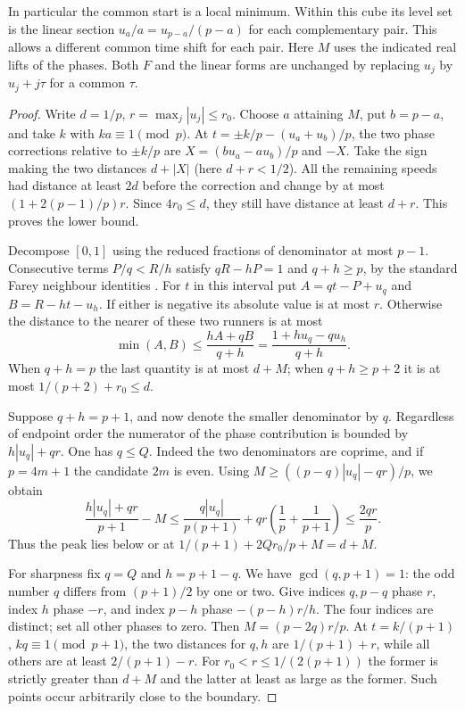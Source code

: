 \documentclass[11pt]{article}
\begin{document}
In particular the common start is a local minimum. Within this cube
its level set is the linear section $u_a/a=u_{p-a}/(p-a)$ for each
complementary pair. This allows a different common time shift for
each pair. Here $M$ uses the indicated real lifts of the phases. Both $F$ and the linear forms are unchanged by replacing
$u_j$ by $u_j+j\tau$ for a common $\tau$.

\begin{proof}
Write $d=1/p$, $r=\max_j|u_j|\le r_0$. Choose $a$ attaining $M$,
put $b=p-a$, and take $k$ with $ka\equiv1\pmod p$. At
$t=\pm k/p-(u_a+u_b)/p$, the two phase corrections relative to
$\pm k/p$ are $X=(bu_a-au_b)/p$ and $-X$. Take the sign making
the two distances $d+|X|$ (here $d+r<1/2$). All the remaining
speeds had distance at least $2d$ before the correction and change
by at most $(1+2(p-1)/p)r$. Since $4r_0\le d$, they still have
distance at least $d+r$. This proves the lower bound.

Decompose $[0,1]$ using the reduced fractions of denominator at most
$p-1$. Consecutive terms $P/q<R/h$ satisfy $qR-hP=1$ and $q+h\ge p$,
by the standard Farey neighbour identities \cite[Ch.~III]{hw}.
For $t$ in this interval put $A=qt-P+u_q$ and $B=R-ht-u_h$.
If either is negative its absolute value is at most $r$.
Otherwise the distance to the nearer of these two runners is at most
\[
 \min(A,B)\le\frac{hA+qB}{q+h}
 =\frac{1+hu_q-qu_h}{q+h}.
\]
When $q+h=p$ the last quantity is at most $d+M$; when
$q+h\ge p+2$ it is at most $1/(p+2)+r_0\le d$.

Suppose $q+h=p+1$, and now denote the smaller denominator by $q$.
Regardless of endpoint order the numerator of the phase contribution
is bounded by $h|u_q|+qr$. One has $q\le Q$. Indeed the two
denominators are coprime, and if $p=4m+1$ the candidate $2m$ is even.
Using $M\ge((p-q)|u_q|-qr)/p$, we obtain
\[
 \frac{h|u_q|+qr}{p+1}-M
 \le \frac{q|u_q|}{p(p+1)}+
 qr\left(\frac1p+\frac1{p+1}\right)\le\frac{2qr}{p}.
\]
Thus the peak lies below or at $1/(p+1)+2Qr_0/p+M=d+M$.

For sharpness fix $q=Q$ and $h=p+1-q$. We have
$\gcd(q,p+1)=1$: the odd number $q$ differs from $(p+1)/2$ by one
or two. Give indices $q,p-q$ phase $r$, index $h$ phase $-r$, and index
$p-h$ phase $-(p-h)r/h$. The four indices are distinct; set
all other phases to zero. Then $M=(p-2q)r/p$. At $t=k/(p+1)$,
$kq\equiv1\pmod{p+1}$, the two distances for $q,h$ are
$1/(p+1)+r$, while all others are at least $2/(p+1)-r$.
For $r_0<r\le1/(2(p+1))$ the former is strictly greater than
$d+M$ and the latter at least as large as the former. Such points
occur arbitrarily close to the boundary.
\end{proof}
\end{document}
